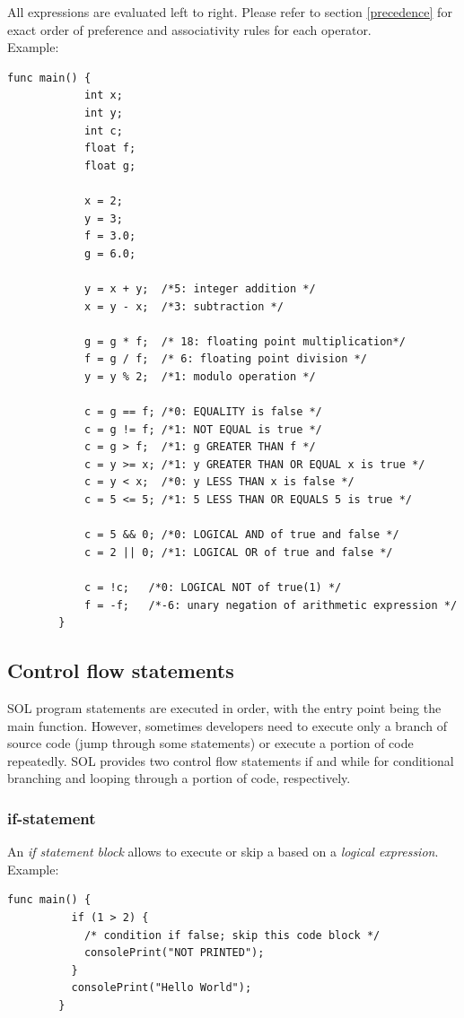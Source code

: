 \documentclass[letterpaper,12pt]{report}
\begin{document}
    All expressions are evaluated left to right. Please refer to section \ref{precedence} for exact order of preference and associativity rules for each operator.\\

    Example:\\
    \begin{lstlisting}[style=sol]
        func main() {
            int x;
            int y;
            int c;
            float f;
            float g;

            x = 2;
            y = 3;
            f = 3.0;
            g = 6.0;

            y = x + y;  /*5: integer addition */
            x = y - x;  /*3: subtraction */

            g = g * f;  /* 18: floating point multiplication*/
            f = g / f;  /* 6: floating point division */
            y = y % 2;  /*1: modulo operation */

            c = g == f; /*0: EQUALITY is false */
            c = g != f; /*1: NOT EQUAL is true */
            c = g > f;  /*1: g GREATER THAN f */
            c = y >= x; /*1: y GREATER THAN OR EQUAL x is true */
            c = y < x;  /*0: y LESS THAN x is false */
            c = 5 <= 5; /*1: 5 LESS THAN OR EQUALS 5 is true */

            c = 5 && 0; /*0: LOGICAL AND of true and false */
            c = 2 || 0; /*1: LOGICAL OR of true and false */

            c = !c;   /*0: LOGICAL NOT of true(1) */
            f = -f;   /*-6: unary negation of arithmetic expression */
        }
    \end{lstlisting} 

    \subsection{Control flow statements}
    SOL program statements are executed in order, with the entry point being the main function. However, sometimes developers need to execute only a branch of source code (jump through some statements) or execute a portion of code repeatedly. SOL provides two control flow statements if and while for conditional branching and looping through a portion of code, respectively.

      \subsubsection{if-statement}
      An \textit {if statement block} allows to execute or skip a  based on a \textit{logical expression}.\\
      Example:\\
      \begin{lstlisting}[style=sol]
        func main() {
          if (1 > 2) {
            /* condition if false; skip this code block */
            consolePrint("NOT PRINTED");
          }
          consolePrint("Hello World");
        }
      \end{lstlisting}
\end{document}
